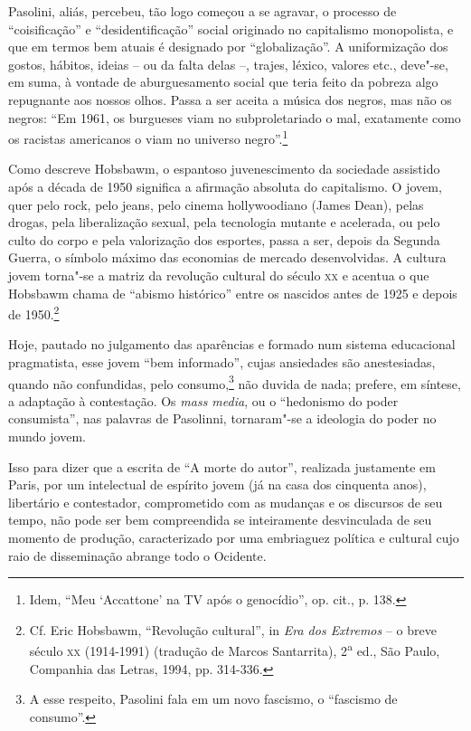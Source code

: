 Pasolini, aliás, percebeu, tão logo começou a se agravar, o processo de
``coisificação'' e ``desidentificação'' social originado no capitalismo
monopolista, e que em termos bem atuais é designado por
``globalização''. A uniformização dos gostos, hábitos, ideias -- ou da
falta delas --, trajes, léxico, valores etc., deve"-se, em suma, à
vontade de aburguesamento social que teria feito da pobreza algo
repugnante aos nossos olhos. Passa a ser aceita a música dos negros, mas
não os negros: ``Em 1961, os burgueses viam no subproletariado o mal,
exatamente como os racistas americanos o viam no universo
negro''.\footnote{Idem, ``Meu `Accattone' na TV após o genocídio'', op.
  cit., p. 138.}

Como descreve Hobsbawm, o espantoso juvenescimento da sociedade
assistido após a década de 1950 significa a afirmação absoluta do
capitalismo. O jovem, quer pelo rock, pelo jeans, pelo cinema
hollywoodiano (James Dean), pelas drogas, pela liberalização sexual,
pela tecnologia mutante e acelerada, ou pelo culto do corpo e pela
valorização dos esportes, passa a ser, depois da Segunda Guerra, o
símbolo máximo das economias de mercado desenvolvidas. A cultura jovem
torna"-se a matriz da revolução cultural do século \textsc{xx} e acentua
o que Hobsbawm chama de ``abismo histórico'' entre os nascidos antes de
1925 e depois de 1950.\footnote{Cf. Eric Hobsbawm, ``Revolução
  cultural'', in \emph{Era dos Extremos} -- o breve século \textsc{xx}
  (1914-1991) (tradução de Marcos Santarrita), 2\textsuperscript{a}
  ed., São Paulo, Companhia das Letras, 1994, pp. 314-336.}

Hoje, pautado no julgamento das aparências e formado num sistema
educacional pragmatista, esse jovem ``bem informado'', cujas ansiedades
são anestesiadas, quando não confundidas, pelo consumo,\footnote{A esse
  respeito, Pasolini fala em um novo fascismo, o ``fascismo de
  consumo''.} não duvida de nada; prefere, em síntese, a adaptação à
contestação. Os \emph{mass media}, ou o ``hedonismo do poder consumista'', nas
palavras de Pasolinni, tornaram"-se a ideologia do poder no mundo jovem.

Isso para dizer que a escrita de ``A morte do autor'', realizada
justamente em Paris, por um intelectual de espírito jovem (já na casa
dos cinquenta anos), libertário e contestador, comprometido com as
mudanças e os discursos de seu tempo, não pode ser bem compreendida se
inteiramente desvinculada de seu momento de produção, caracterizado por
uma embriaguez política e cultural cujo raio de disseminação abrange
todo o Ocidente.

